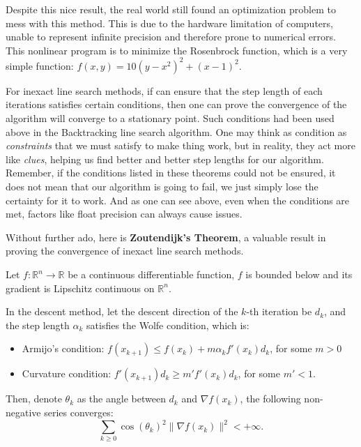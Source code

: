 Despite this nice result, the real world still found an optimization problem to
mess with this method. This is due to the hardware limitation of computers,
unable to represent infinite precision and therefore prone to numerical errors.
This nonlinear program is to minimize the Rosenbrock function, which is a very
simple function: \( f(x, y) = 10(y-x^2)^2+(x-1)^2 \).

For inexact line search methods, if can ensure that the step length of each
iterations satisfies certain conditions, then one can prove the convergence of
the algorithm will converge to a stationary point. Such conditions had been
used above in the Backtracking line search algorithm. One may think as condition
as \textit{constraints} that we must satisfy to make thing work, but in reality,
they act more like \textit{clues}, helping us find better and better step
lengths for our algorithm. Remember, if the conditions listed in these theorems
could not be ensured, it does not mean that our algorithm is going to fail,
we just simply lose the certainty for it to work. And as one can see above, even
when the conditions are met, factors like float precision can always cause
issues.

Without further ado, here is \textbf{Zoutendijk's Theorem}, a valuable result in
proving the convergence of inexact line search methods.

\begin{theorem}
\label{thr:Zoutendijk's Theorem}
  Let \( f: \mathbb{R}^{n} \to \mathbb{R} \) be a continuous
  differentiable function, \( f \) is bounded below and its gradient is
  Lipschitz continuous on \( \mathbb{R}^{n} \).

  In the descent method, let the descent direction of the \( k \)-th iteration
  be \( d_{k} \), and the step length \( \alpha_{k} \) satisfies the Wolfe
  condition, which is:
  \begin{itemize}
  \item Armijo's condition: \( f(x_{k+1}) \le f(x_{k}) +
    m\alpha_{k}f'(x_{k})d_{k} \), for some \( m > 0 \)
  \item Curvature condition: \( f'(x_{k + 1})d_{k} \ge
    m'f'(x_{k})d_{k} \), for some \( m' < 1 \).
  \end{itemize}

  Then, denote \( \theta_{k} \) as the angle between \( d_{k} \) and \( \nabla
  f(x_{k}) \), the following non-negative series converges:
  \[
    \sum_{k \ge 0} \cos(\theta_{k})^2 \|\nabla f(x_{k})\|^2 < +\infty
  .\] 
\end{theorem}

